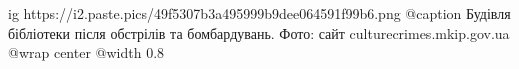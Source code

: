  
 
 
 
 

\ifcmt
  ig https://i2.paste.pics/49f5307b3a495999b9dee064591f99b6.png
	@caption Будівля бібліотеки після обстрілів та бомбардувань. Фото: сайт culturecrimes.mkip.gov.ua
  @wrap center
  @width 0.8
\fi
